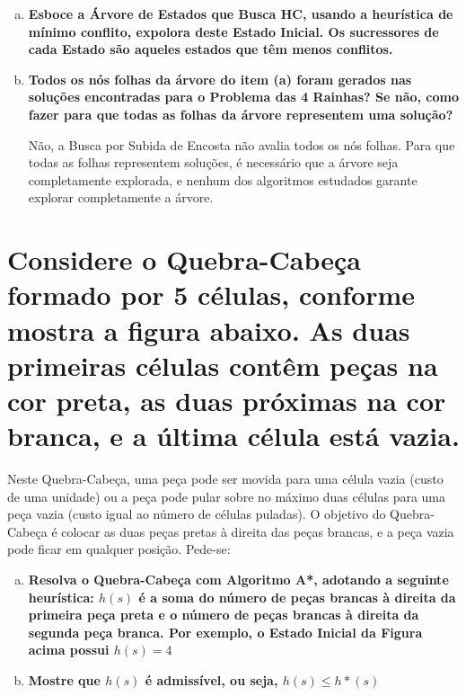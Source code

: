 \documentclass[paper=a4, fontsize=11pt]{scrartcl} %
\begin{document}
    \begin{enumerate}[(a)]
        \item \textbf{Esboce a Árvore de Estados que Busca HC, usando a heurística de mínimo conflito, expolora deste Estado Inicial. Os sucressores de cada Estado são aqueles estados que têm menos conflitos.}
        \par 
        \vspace{0.2cm}

        \item \textbf{Todos os nós folhas da árvore do item (a) foram gerados nas soluções encontradas para o Problema das 4 Rainhas? Se não, como fazer para que todas as folhas da árvore representem uma solução?}
        \par Não, a Busca por Subida de Encosta não avalia todos os nós folhas. Para que todas as folhas representem soluções, é necessário que a árvore seja completamente explorada, e nenhum dos algoritmos estudados garante explorar completamente a árvore.
        \vspace{0.2cm}

    \end{enumerate}

    
    \section{Considere o Quebra-Cabeça formado por 5 células, conforme mostra a figura abaixo. As duas primeiras células contêm peças na cor preta, as duas próximas na cor branca, e a última célula está vazia.}
    
   
    \par{Neste Quebra-Cabeça, uma peça pode ser movida para uma célula vazia (custo de uma unidade) ou a peça pode pular sobre no máximo duas células para uma peça vazia (custo igual ao número de células puladas). O objetivo do Quebra-Cabeça é colocar as duas peças pretas à direita das peças brancas, e a peça vazia pode ficar em qualquer posição. Pede-se:}

    \begin{enumerate}[(a)]
        \pagebreak
        \item \textbf{Resolva o Quebra-Cabeça com Algoritmo A*, adotando a seguinte heurística: $h(s)$ é a soma do número de peças brancas à direita da primeira peça preta e o número de peças brancas à direita da segunda peça branca. Por exemplo, o Estado Inicial da Figura acima possui $h(s) = 4$}
        \par 
        \vspace{0.2cm}

        \item \textbf{Mostre que $h(s)$ é admissível, ou seja, $h(s) \leq h*(s)$}
        \par 
        \vspace{0.2cm}

    \end{enumerate}


    
\end{document}
